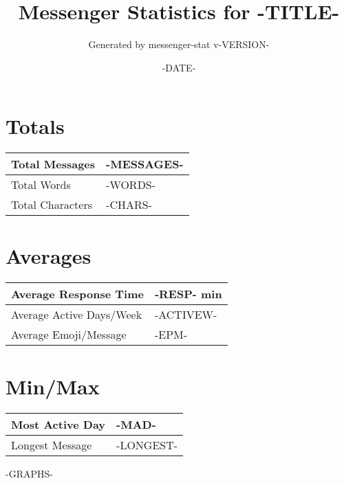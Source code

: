 \documentclass[11pt]{article}
\title{Messenger Statistics for -TITLE-}
\author{Generated by messenger-stat v-VERSION-}
\date{-DATE-}
\begin{document}
\maketitle

\section*{Totals}
\begin{center}
    \begin{tabularx}{\textwidth}{ | X | p{5cm} | }
    \hline
        Total Messages & -MESSAGES- \\ \hline
        Total Words & -WORDS- \\ \hline
        Total Characters & -CHARS- \\
    \hline
    \end{tabularx}
\end{center}

\section*{Averages}
\begin{center}
    \begin{tabularx}{\textwidth}{ | X | p{5cm} | }
    \hline
        Average Response Time & -RESP- min \\ \hline
        Average Active Days/Week & -ACTIVEW- \\ \hline
        Average Emoji/Message & -EPM- \\
    \hline
    \end{tabularx}
\end{center}

\section*{Min/Max}
\begin{center}
    \begin{tabularx}{\textwidth}{ | X | p{5cm} | }
    \hline
        Most Active Day & -MAD- \\ \hline
        Longest Message & -LONGEST- \\
    \hline
    \end{tabularx}
\end{center}

\clearpage
-GRAPHS-
\end{document}
